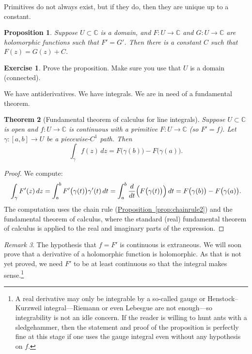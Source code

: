 \documentclass[12pt,openany]{book}
\newcommand{\C}{{\mathbb{C}}}
\theoremstyle{plain}
\newtheorem{thm}{Theorem}[section]
\newtheorem{prop}[thm]{Proposition}
\theoremstyle{remark}
\newtheorem{remark}[thm]{Remark}
\theoremstyle{definition}
\newenvironment{exbox}{%
    \def\FrameCommand{\vrule width 1pt \relax\hspace{10pt}}%
    \MakeFramed{\advance\hsize-\width\FrameRestore}%
}{%
    \endMakeFramed
}
\theoremstyle{exercise}
\newtheorem{exercise}{Exercise}[section]
\theoremstyle{example}
\newcommand{\propref}[1]{\hyperref[#1]{Proposition~\ref*{#1}}}
\begin{document}
Primitives do not always exist, but if they do, then they are unique up
to a constant.

\begin{prop} \label{prop:primunique}
Suppose $U \subset \C$ is a domain, and
$F \colon U \to \C$ and
$G \colon U \to \C$ are holomorphic functions such that $F' = G'$.  Then
there is a constant $C$ such that
$F(z) = G(z) + C$.
\end{prop}

\begin{exbox}
\begin{exercise}
Prove the proposition.
Make sure you use that $U$ is a domain (connected).
\end{exercise}
\end{exbox}

We have antiderivatives.  We have integrals.  We are in need of a
fundamental theorem.

\begin{thm}[Fundamental theorem of calculus for line integrals]
%
Suppose $U \subset \C$ is open and $f \colon U \to \C$
is continuous with a primitive $F \colon U \to \C$ (so $F' = f$).
Let $\gamma \colon [a,b] \to U$ be a piecewise-$C^1$ path.
Then
\begin{equation*}
\int_\gamma f(z) \, dz =
F\bigl( \gamma(b) \bigr) - F\bigl( \gamma(a)
\bigr) .
\end{equation*}
\end{thm}

\begin{proof}
We compute:
\begin{equation*}
\int_\gamma F'(z) \, dz
=
\int_a^b F'\bigl(\gamma(t)\bigr) \gamma'(t) \, dt 
=
\int_a^b \frac{d}{dt} \Bigl( F\bigl(\gamma(t)\bigr) \Bigr) \, dt 
=
F\bigl( \gamma(b) \bigr) - F\bigl( \gamma(a) \bigr) .
\end{equation*}
The computation uses the chain rule (\propref{prop:chainrule2})
and the fundamental theorem of calculus, where the
standard (real) fundamental theorem of calculus is applied to the real and imaginary parts
of the expression.
\end{proof}

\begin{remark}
The hypothesis that $f=F'$ is continuous is extraneous.
We will soon prove that a derivative of a holomorphic function is
holomorphic.  As that is not yet proved, we need $F'$ to be at least
continuous so that the integral makes sense.\footnote{%
A real derivative may only be integrable
by a so-called gauge or Henstock--Kurzweil integral---Riemann or
even Lebesgue are not enough---so integrability is not an idle concern.
If the reader is willing to hunt ants with a sledgehammer, then
the statement and proof of the proposition is perfectly fine at this stage
if one uses the gauge integral even without any hypothesis on $f$.}
\end{remark}
\end{document}
